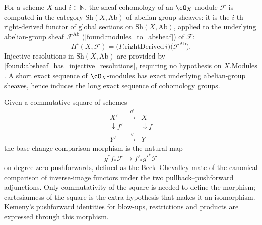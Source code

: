 \begin{definition}
  \leanok
  \label{def:peer_scheme_hmodule}
  For a scheme \(X\) and \(i\in\mathbb N\), the sheaf cohomology of an
  \(\cO_X\)-module \(\mathcal F\) is computed in the category
  \(\mathrm{Sh}(X,\mathrm{Ab})\) of abelian-group sheaves: it is the \(i\)-th
  right-derived functor of global sections on \(\mathrm{Sh}(X,\mathrm{Ab})\),
  applied to the underlying abelian-group sheaf
  \(\mathcal F^{\mathrm{Ab}}\) (\cref{found:modules_to_absheaf}) of
  \(\mathcal F\):
  \[
    H^i(X,\mathcal F)=\bigl(\Gamma.\mathrm{rightDerived}\,i\bigr)\bigl(\mathcal F^{\mathrm{Ab}}\bigr).
  \]
  Injective resolutions in \(\mathrm{Sh}(X,\mathrm{Ab})\) are provided by
  \cref{found:absheaf_has_injective_resolutions}, requiring no hypothesis on
  \(X.\mathrm{Modules}\).  A short exact sequence of \(\cO_X\)-modules has exact
  underlying abelian-group sheaves, hence induces the long exact sequence of
  cohomology groups.
\end{definition}

\begin{definition}
  \leanok
  \label{def:peer_affine_pushforward_base_change}
  Given a commutative square of schemes
  \[
    \begin{array}{ccc}
      X' & \xrightarrow{\,g'\,} & X\\
      \downarrow{\scriptstyle f'} & & \downarrow{\scriptstyle f}\\
      Y' & \xrightarrow{\,g\,} & Y
    \end{array}
  \]
  the base-change comparison morphism is the natural map
  \[
    g^*f_*\mathcal F\to f'_*g'^*\mathcal F
  \]
  on degree-zero pushforwards, defined as the Beck--Chevalley mate of the
  canonical comparison of inverse-image functors under the two
  pullback--pushforward adjunctions.  Only commutativity of the square is needed
  to define the morphism; cartesianness of the square is the extra hypothesis that
  makes it an isomorphism.  Kemeny's pushforward identities for blow-ups, restrictions and products are
  expressed through this morphism.
\end{definition}

